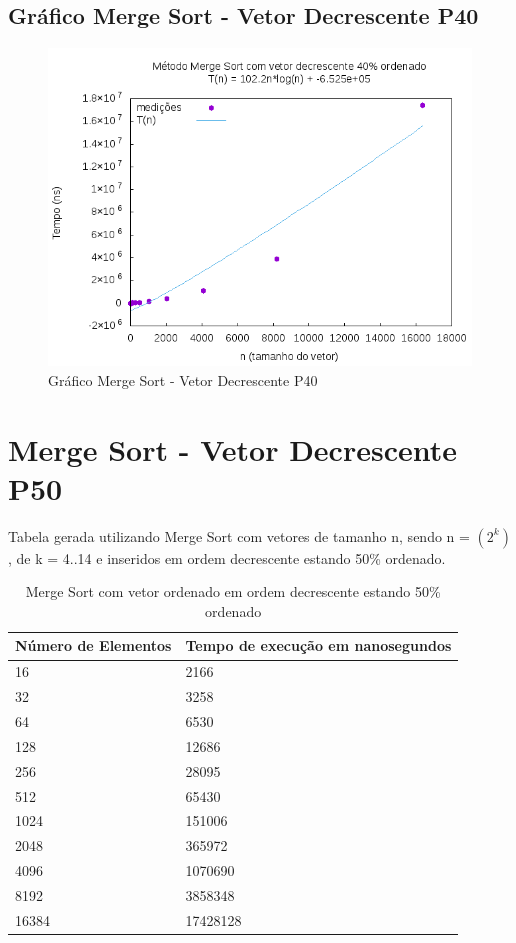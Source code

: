 \documentclass[12pt,a4paper,twoside]{report}
\begin{document}
\subsection{Gráfico Merge Sort - Vetor Decrescente P40}
\begin{figure}[H]
    \centering
    \includegraphics[width=0.7\linewidth]{graficos/MergeSort/vIntDecrescenteP40/vIntDecrescenteP40.png}
  \caption{Gráfico Merge Sort - Vetor Decrescente P40}
\end{figure}

\section{Merge Sort - Vetor Decrescente P50}
Tabela gerada utilizando Merge Sort com vetores de tamanho n, sendo n = $(2^k)$, de k = 4..14 e inseridos em ordem decrescente estando 50\% ordenado.
\begin{table}[H]
\centering
\caption{Merge Sort com vetor ordenado em ordem decrescente estando 50\% ordenado}
\label{my-label}
\begin{tabular}{|l|l|}
\hline
\multicolumn{1}{|c|}{\textbf{Número de Elementos}} & \multicolumn{1}{c|}{\textbf{Tempo de execução em nanosegundos}} \\ \hline
16 & 2166 \\ \hline
32 & 3258 \\ \hline
64 & 6530 \\ \hline
128 & 12686 \\ \hline
256 & 28095 \\ \hline
512 & 65430 \\ \hline
1024 & 151006 \\ \hline
2048 & 365972 \\ \hline
4096 & 1070690 \\ \hline
8192 & 3858348 \\ \hline
16384 & 17428128 \\ \hline
\end{tabular}
\end{table}
\end{document}
